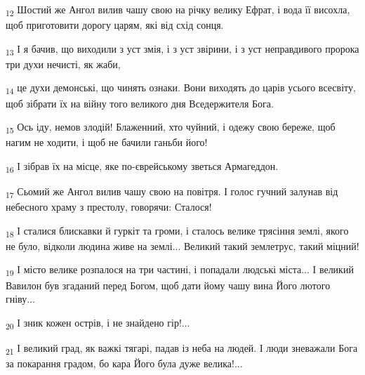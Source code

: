 \begin{tcolorbox}
\textsubscript{12} Шостий же Ангол вилив чашу свою на річку велику Ефрат, і вода її висохла, щоб приготовити дорогу царям, які від схід сонця.
\end{tcolorbox}
\begin{tcolorbox}
\textsubscript{13} І я бачив, що виходили з уст змія, і з уст звірини, і з уст неправдивого пророка три духи нечисті, як жаби,
\end{tcolorbox}
\begin{tcolorbox}
\textsubscript{14} це духи демонські, що чинять ознаки. Вони виходять до царів усього всесвіту, щоб зібрати їх на війну того великого дня Вседержителя Бога.
\end{tcolorbox}
\begin{tcolorbox}
\textsubscript{15} Ось іду, немов злодій! Блаженний, хто чуйний, і одежу свою береже, щоб нагим не ходити, і щоб не бачили ганьби його!
\end{tcolorbox}
\begin{tcolorbox}
\textsubscript{16} І зібрав їх на місце, яке по-єврейському зветься Армагеддон.
\end{tcolorbox}
\begin{tcolorbox}
\textsubscript{17} Сьомий же Ангол вилив чашу свою на повітря. І голос гучний залунав від небесного храму з престолу, говорячи: Сталося!
\end{tcolorbox}
\begin{tcolorbox}
\textsubscript{18} І сталися блискавки й гуркіт та громи, і сталось велике трясіння землі, якого не було, відколи людина живе на землі... Великий такий землетрус, такий міцний!
\end{tcolorbox}
\begin{tcolorbox}
\textsubscript{19} І місто велике розпалося на три частині, і попадали людські міста... І великий Вавилон був згаданий перед Богом, щоб дати йому чашу вина Його лютого гніву...
\end{tcolorbox}
\begin{tcolorbox}
\textsubscript{20} І зник кожен острів, і не знайдено гір!...
\end{tcolorbox}
\begin{tcolorbox}
\textsubscript{21} І великий град, як важкі тягарі, падав із неба на людей. І люди зневажали Бога за покарання градом, бо кара Його була дуже велика!...
\end{tcolorbox}
